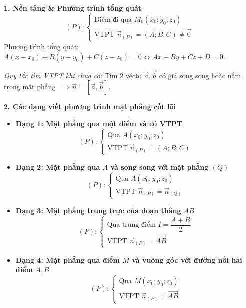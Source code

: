 \documentclass[12pt,a4paper]{article}
\begin{document}
\begin{theorybox}
    \textbf{\textcolor{deepblue}{\large 1. Nền tảng \& Phương trình tổng quát}}
    \[
        (P)\colon \begin{cases} 
            \text{Điểm đi qua } M_0(x_0; y_0; z_0) \\ 
            \text{VTPT } \vec{n}_{(P)} = (A; B; C) \neq \vec{0}
        \end{cases}
    \]
    Phương trình tổng quát: $A(x - x_0) + B(y - y_0) + C(z - z_0) = 0 \iff Ax + By + Cz + D = 0$.
    \par\vspace{3pt}
    \textit{Quy tắc tìm VTPT khi chưa có:} Tìm 2 véctơ $\vec{a}, \vec{b}$ có giá song song hoặc nằm trong mặt phẳng $\implies \vec{n} = [\vec{a}, \vec{b}]$.

    \vspace{0.2cm}
    \textbf{\textcolor{amberorange}{\large 2. Các dạng viết phương trình mặt phẳng cốt lõi}}
    \begin{itemize}\setlength{\itemsep}{8pt}
        \item \textbf{Dạng 1: Mặt phẳng qua một điểm và có VTPT}
        \[
            (P)\colon \begin{cases} \text{Qua } A(x_0; y_0; z_0) \\ \text{VTPT } \vec{n}_{(P)} = (A; B; C) \end{cases}
        \]

        \item \textbf{Dạng 2: Mặt phẳng qua $A$ và song song với mặt phẳng $(Q)$}
        \[
            (P)\colon \begin{cases} \text{Qua } A(x_0; y_0; z_0) \\ \text{VTPT } \vec{n}_{(P)} = \vec{n}_{(Q)} \end{cases}
        \]

        \item \textbf{Dạng 3: Mặt phẳng trung trực của đoạn thẳng $AB$}
        \[
            (P)\colon \begin{cases} \text{Qua trung điểm } I = \dfrac{A + B}{2} \\ \text{VTPT } \vec{n}_{(P)} = \vec{AB} \end{cases}
        \]

        \item \textbf{Dạng 4: Mặt phẳng qua điểm $M$ và vuông góc với đường nối hai điểm $A, B$}
        \[
            (P)\colon \begin{cases} \text{Qua } M(x_0; y_0; z_0) \\ \text{VTPT } \vec{n}_{(P)} = \vec{AB} \end{cases}
        \]


\end{itemize}
\end{theorybox}
\end{document}
